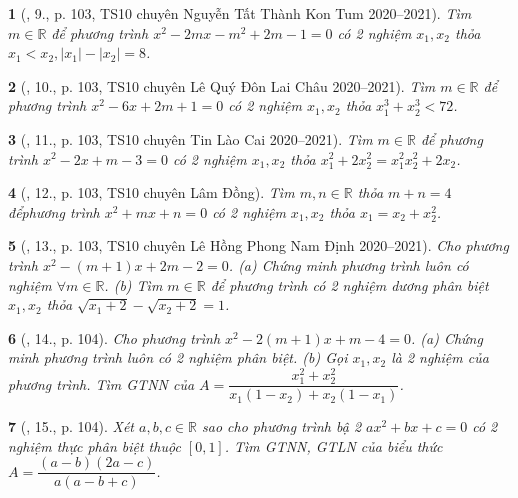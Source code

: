 \documentclass{article}
\newtheorem{baitoan}{}
\begin{document}
\begin{baitoan}[\cite{Thu_Viet_Minh_ptb2}, 9., p. 103, TS10 chuyên Nguyễn Tất Thành Kon Tum 2020--2021]
	Tìm $m\in\mathbb{R}$ để phương trình $x^2 - 2mx - m^2 + 2m - 1 = 0$ có 2 nghiệm $x_1,x_2$ thỏa $x_1 < x_2,|x_1| - |x_2| = 8$.
\end{baitoan}

\begin{baitoan}[\cite{Thu_Viet_Minh_ptb2}, 10., p. 103, TS10 chuyên Lê Quý Đôn Lai Châu 2020--2021]
	Tìm $m\in\mathbb{R}$ để phương trình $x^2 - 6x + 2m + 1 = 0$ có 2 nghiệm $x_1,x_2$ thỏa $x_1^3 + x_2^3 < 72$.
\end{baitoan}

\begin{baitoan}[\cite{Thu_Viet_Minh_ptb2}, 11., p. 103, TS10 chuyên Tin Lào Cai 2020--2021]
	Tìm $m\in\mathbb{R}$ để phương trình $x^2 - 2x + m - 3 = 0$ có 2 nghiệm $x_1,x_2$ thỏa $x_1^2 + 2x_2^2 = x_1^2x_2^2 + 2x_2$.
\end{baitoan}

\begin{baitoan}[\cite{Thu_Viet_Minh_ptb2}, 12., p. 103, TS10 chuyên Lâm Đồng]
	Tìm $m,n\in\mathbb{R}$ thỏa $m + n = 4$ đểphương trình $x^2 + mx + n = 0$ có 2 nghiệm $x_1,x_2$ thỏa $x_1 = x_2 + x_2^2$.
\end{baitoan}

\begin{baitoan}[\cite{Thu_Viet_Minh_ptb2}, 13., p. 103, TS10 chuyên Lê Hồng Phong Nam Định 2020--2021]
	Cho phương trình $x^2 - (m + 1)x + 2m - 2 = 0$. (a) Chứng minh phương trình luôn có nghiệm $\forall m\in\mathbb{R}$. (b) Tìm $m\in\mathbb{R}$ để phương trình có 2 nghiệm dương phân biệt $x_1,x_2$ thỏa $\sqrt{x_1 + 2} - \sqrt{x_2 + 2} = 1$.
\end{baitoan}

\begin{baitoan}[\cite{Thu_Viet_Minh_ptb2}, 14., p. 104]
	Cho phương trình $x^2 - 2(m + 1)x + m - 4 = 0$. (a) Chứng minh phương trình luôn có 2 nghiệm phân biệt. (b) Gọi $x_1,x_2$ là 2 nghiệm của phương trình. Tìm {\rm GTNN} của $A = \dfrac{x_1^2 + x_2^2}{x_1(1 - x_2) + x_2(1 - x_1)}$.
\end{baitoan}

\begin{baitoan}[\cite{Thu_Viet_Minh_ptb2}, 15., p. 104]
	Xét $a,b,c\in\mathbb{R}$ sao cho phương trình bậ 2 $ax^2 + bx + c = 0$ có 2 nghiệm thực phân biệt thuộc $[0,1]$. Tìm {\rm GTNN, GTLN} của biểu thức $A = \dfrac{(a - b)(2a - c)}{a(a - b + c)}$.
\end{baitoan}
\end{document}
